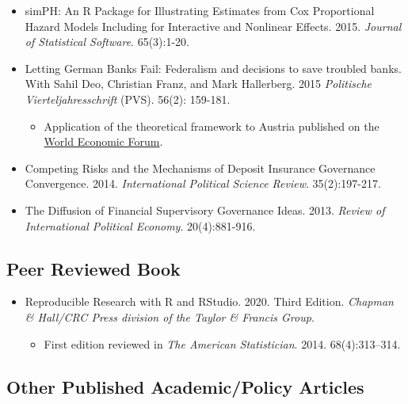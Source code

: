 \documentclass[a4paper]{article}
\begin{document}
\begin{itemize}
    \item simPH: An R Package for Illustrating Estimates from Cox Proportional Hazard Models Including for Interactive and Nonlinear Effects. 2015. {\emph{Journal of Statistical Software}}. 65(3):1-20.

    \item Letting German Banks Fail: Federalism and decisions to save troubled banks. With Sahil Deo, Christian Franz, and Mark Hallerberg. 2015 \emph{Politische Vierteljahresschrift} (PVS). 56(2): 159-181.

        \begin{itemize}
            \item Application of the theoretical framework to Austria published on the \href{https://www.weforum.org/agenda/2015/03/a-bank-bailout-lesson-from-austria/}{World Economic Forum}.
        \end{itemize}

    \item Competing Risks and the Mechanisms of Deposit Insurance Governance Convergence. 2014. {\emph{International Political Science Review}}. 35(2):197-217.

    \item The Diffusion of Financial Supervisory Governance Ideas. 2013. {\emph{Review of International Political Economy}}. 20(4):881-916.

\end{itemize}

\subsection*{Peer Reviewed Book}

\begin{itemize}
    \item Reproducible Research with R and RStudio. 2020. Third Edition. {\emph{Chapman \& Hall/CRC Press division of the Taylor \& Francis Group}}.

        \begin{itemize}
            \item First edition reviewed in \emph{The American Statistician}. 2014. 68(4):313--314.
        \end{itemize}

\end{itemize}

\subsection*{Other Published Academic/Policy Articles}
\end{document}

